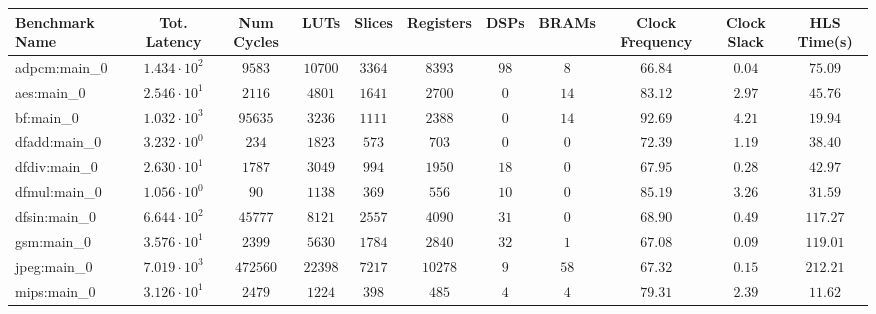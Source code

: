 \begin{tabular}{|l|c|c|c|c|c|c|c|c|c|c|}
\hline
Benchmark Name      & Tot. Latency           & Num Cycles & LUTs      & Slices    & Registers & DSPs    & BRAMs   & Clock Frequency & Clock Slack & HLS Time(s) \\
\hline
adpcm:main\_0       & $ 1.434 \cdot 10^{2} $ & $ 9583   $ & $ 10700 $ & $ 3364  $ & $ 8393  $ & $ 98  $ & $ 8   $ & $ 66.84       $ & $ 0.04    $ & $ 75.09   $ \\
aes:main\_0         & $ 2.546 \cdot 10^{1} $ & $ 2116   $ & $ 4801  $ & $ 1641  $ & $ 2700  $ & $ 0   $ & $ 14  $ & $ 83.12       $ & $ 2.97    $ & $ 45.76   $ \\
bf:main\_0          & $ 1.032 \cdot 10^{3} $ & $ 95635  $ & $ 3236  $ & $ 1111  $ & $ 2388  $ & $ 0   $ & $ 14  $ & $ 92.69       $ & $ 4.21    $ & $ 19.94   $ \\
dfadd:main\_0       & $ 3.232 \cdot 10^{0} $ & $ 234    $ & $ 1823  $ & $ 573   $ & $ 703   $ & $ 0   $ & $ 0   $ & $ 72.39       $ & $ 1.19    $ & $ 38.40   $ \\
dfdiv:main\_0       & $ 2.630 \cdot 10^{1} $ & $ 1787   $ & $ 3049  $ & $ 994   $ & $ 1950  $ & $ 18  $ & $ 0   $ & $ 67.95       $ & $ 0.28    $ & $ 42.97   $ \\
dfmul:main\_0       & $ 1.056 \cdot 10^{0} $ & $ 90     $ & $ 1138  $ & $ 369   $ & $ 556   $ & $ 10  $ & $ 0   $ & $ 85.19       $ & $ 3.26    $ & $ 31.59   $ \\
dfsin:main\_0       & $ 6.644 \cdot 10^{2} $ & $ 45777  $ & $ 8121  $ & $ 2557  $ & $ 4090  $ & $ 31  $ & $ 0   $ & $ 68.90       $ & $ 0.49    $ & $ 117.27  $ \\
gsm:main\_0         & $ 3.576 \cdot 10^{1} $ & $ 2399   $ & $ 5630  $ & $ 1784  $ & $ 2840  $ & $ 32  $ & $ 1   $ & $ 67.08       $ & $ 0.09    $ & $ 119.01  $ \\
jpeg:main\_0        & $ 7.019 \cdot 10^{3} $ & $ 472560 $ & $ 22398 $ & $ 7217  $ & $ 10278 $ & $ 9   $ & $ 58  $ & $ 67.32       $ & $ 0.15    $ & $ 212.21  $ \\
mips:main\_0        & $ 3.126 \cdot 10^{1} $ & $ 2479   $ & $ 1224  $ & $ 398   $ & $ 485   $ & $ 4   $ & $ 4   $ & $ 79.31       $ & $ 2.39    $ & $ 11.62   $ \\

\end{tabular}
